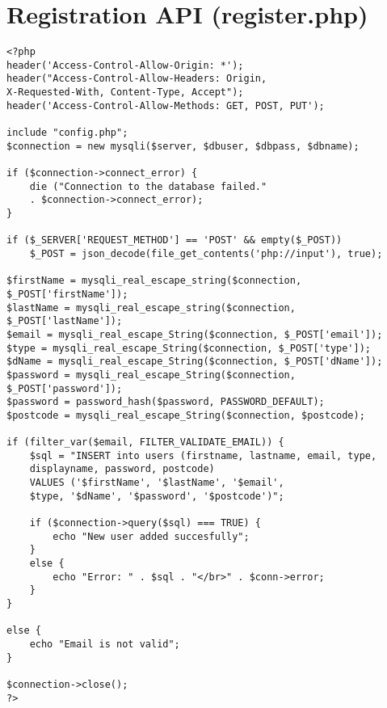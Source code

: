 \section{Registration API (register.php)}
\begin{verbatim}
<?php
header('Access-Control-Allow-Origin: *');
header("Access-Control-Allow-Headers: Origin, 
X-Requested-With, Content-Type, Accept");
header('Access-Control-Allow-Methods: GET, POST, PUT');

include "config.php";
$connection = new mysqli($server, $dbuser, $dbpass, $dbname);

if ($connection->connect_error) {
    die ("Connection to the database failed." 
    . $connection->connect_error);
}

if ($_SERVER['REQUEST_METHOD'] == 'POST' && empty($_POST))
    $_POST = json_decode(file_get_contents('php://input'), true);

$firstName = mysqli_real_escape_string($connection, $_POST['firstName']);
$lastName = mysqli_real_escape_string($connection, $_POST['lastName']);
$email = mysqli_real_escape_String($connection, $_POST['email']);
$type = mysqli_real_escape_String($connection, $_POST['type']);
$dName = mysqli_real_escape_String($connection, $_POST['dName']);
$password = mysqli_real_escape_String($connection, $_POST['password']);
$password = password_hash($password, PASSWORD_DEFAULT);
$postcode = mysqli_real_escape_String($connection, $postcode);

if (filter_var($email, FILTER_VALIDATE_EMAIL)) {
    $sql = "INSERT into users (firstname, lastname, email, type, 
    displayname, password, postcode)
    VALUES ('$firstName', '$lastName', '$email', 
    $type, '$dName', '$password', '$postcode')";

    if ($connection->query($sql) === TRUE) {
        echo "New user added succesfully";
    } 
    else {
        echo "Error: " . $sql . "</br>" . $conn->error;
    }
}

else {
    echo "Email is not valid";
}

$connection->close();
?>
\end{verbatim}

